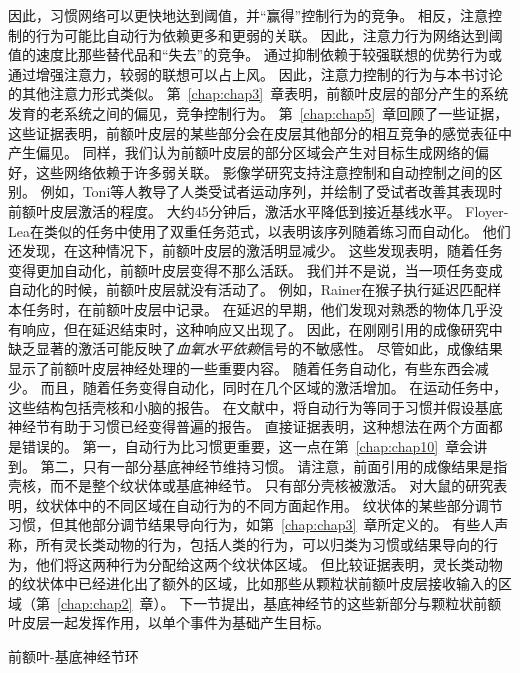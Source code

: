因此，习惯网络可以更快地达到阈值，并“赢得”控制行为的竞争。
相反，注意控制的行为可能比自动行为依赖更多和更弱的关联。
因此，注意力行为网络达到阈值的速度比那些替代品和“失去”的竞争。
通过抑制依赖于较强联想的优势行为或通过增强注意力，较弱的联想可以占上风。
因此，注意力控制的行为与本书讨论的其他注意力形式类似。
第~\ref{chap:chap3}~章表明，前额叶皮层的部分产生的系统发育的老系统之间的偏见，竞争控制行为。
第~\ref{chap:chap5}~章回顾了一些证据，这些证据表明，前额叶皮层的某些部分会在皮层其他部分的相互竞争的感觉表征中产生偏见。
同样，我们认为前额叶皮层的部分区域会产生对目标生成网络的偏好，这些网络依赖于许多弱关联。
影像学研究支持注意控制和自动控制之间的区别。
例如，Toni等人\cite{toni1998time}教导了人类受试者运动序列，并绘制了受试者改善其表现时前额叶皮层激活的程度。
大约45分钟后，激活水平降低到接近基线水平。
Floyer-Lea\cite{floyer2004changing}在类似的任务中使用了双重任务范式，以表明该序列随着练习而自动化。
他们还发现，在这种情况下，前额叶皮层的激活明显减少。
这些发现表明，随着任务变得更加自动化，前额叶皮层变得不那么活跃。
我们并不是说，当一项任务变成自动化的时候，前额叶皮层就没有活动了。
例如，Rainer\cite{rainer2002timecourse}在猴子执行延迟匹配样本任务时，在前额叶皮层中记录。
在延迟的早期，他们发现对熟悉的物体几乎没有响应，但在延迟结束时，这种响应又出现了。
因此，在刚刚引用的成像研究中缺乏显著的激活可能反映了\textit{血氧水平依赖}信号的不敏感性。
尽管如此，成像结果显示了前额叶皮层神经处理的一些重要内容。
随着任务自动化，有些东西会减少。
而且，随着任务变得自动化，同时在几个区域的激活增加。
在运动任务中，这些结构包括壳核和小脑\cite{floyer2004changing,toni1998time}的报告。
在文献中，将自动行为等同于习惯并假设基底神经节有助于习惯已经变得普遍\cite{fernandez2001visual,broadbent2007rats}的报告。
直接证据表明，这种想法在两个方面都是错误的。
第一，自动行为比习惯更重要，这一点在第~\ref{chap:chap10}~章会讲到。
第二，只有一部分基底神经节维持习惯。
请注意，前面引用的成像结果是指壳核，而不是整个纹状体或基底神经节。
只有部分壳核被激活。
对大鼠的研究表明，纹状体中的不同区域在自动行为的不同方面起作用\cite{yin2008reward}。
纹状体的某些部分调节习惯，但其他部分调节结果导向行为，如第~\ref{chap:chap3}~章所定义的。
有些人声称，所有灵长类动物的行为，包括人类的行为，可以归类为习惯或结果导向的行为，他们将这两种行为分配给这两个纹状体区域\cite{balleine2010human}。
但比较证据表明，灵长类动物的纹状体中已经进化出了额外的区域，比如那些从颗粒状前额叶皮层接收输入的区域（第~\ref{chap:chap2}~章）。
下一节提出，基底神经节的这些新部分与颗粒状前额叶皮层一起发挥作用，以单个事件为基础产生目标。



前额叶-基底神经节环

